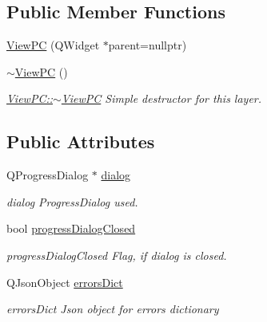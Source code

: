 \subsection*{Public Member Functions}
\begin{DoxyCompactItemize}
\item 
\hyperlink{class_view_p_c_a33c96c61f61042319c66c19059836b7f}{View\-P\-C} (Q\-Widget $\ast$parent=nullptr)
\item 
\hyperlink{class_view_p_c_a91c51f5c1e6ed5ab12b410339f469b0f}{$\sim$\-View\-P\-C} ()
\begin{DoxyCompactList}\small\item\em \hyperlink{class_view_p_c_a91c51f5c1e6ed5ab12b410339f469b0f}{View\-P\-C\-::$\sim$\-View\-P\-C} Simple destructor for this layer. \end{DoxyCompactList}\end{DoxyCompactItemize}
\subsection*{Public Attributes}
\begin{DoxyCompactItemize}
\item 
Q\-Progress\-Dialog $\ast$ \hyperlink{class_view_p_c_a31abbb470fe329b44e6ffee202b903ca}{dialog}
\begin{DoxyCompactList}\small\item\em dialog Progress\-Dialog used. \end{DoxyCompactList}\item 
bool \hyperlink{class_view_p_c_add8c82aa2b0b934212aa5bde9277ab36}{progress\-Dialog\-Closed}
\begin{DoxyCompactList}\small\item\em progress\-Dialog\-Closed Flag, if dialog is closed. \end{DoxyCompactList}\item 
Q\-Json\-Object \hyperlink{class_view_p_c_a26f90436aca32e5bad46f5e69a7e7e09}{errors\-Dict}
\begin{DoxyCompactList}\small\item\em errors\-Dict Json object for errors dictionary \end{DoxyCompactList}\end{DoxyCompactItemize}
